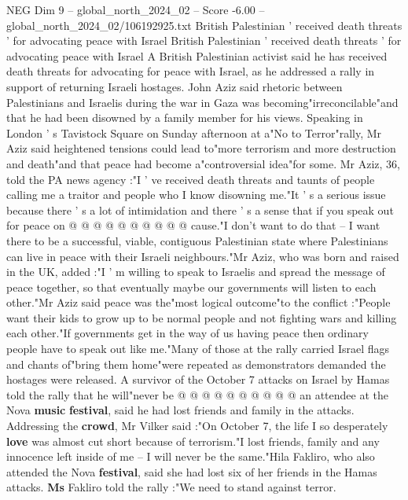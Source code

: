 \begin{textsample}{NEG Dim 9 – global\_north\_2024\_02 – Score -6.00 – global\_north\_2024\_02/106192925.txt}  \label{ex:f9_neg_285}
British Palestinian ' received death threats ' for advocating peace with Israel British Palestinian ' received death threats ' for advocating peace with Israel A British Palestinian activist said he has received death threats for advocating for peace with Israel, as he addressed a rally in support of returning Israeli hostages.
John Aziz said rhetoric between Palestinians and Israelis during the war in Gaza was becoming"irreconcilable"and that he had been disowned by a family member for his views.
Speaking in London ' s Tavistock Square on Sunday afternoon at a"No to Terror"rally, Mr Aziz said heightened tensions could lead to"more terrorism and more destruction and death"and that peace had become a"controversial idea"for some.
Mr Aziz, 36, told the PA news agency :"I ' ve received death threats and taunts of people calling me a traitor and people who I know disowning me."It ' s a serious issue because there ' s a lot of intimidation and there ' s a sense that if you speak out for peace on @ @ @ @ @ @ @ @ @ @ cause."I don't want to do that -- I want there to be a successful, viable, contiguous Palestinian state where Palestinians can live in peace with their Israeli neighbours."Mr Aziz, who was born and raised in the UK, added :"I ' m willing to speak to Israelis and spread the message of peace together, so that eventually maybe our governments will listen to each other."Mr Aziz said peace was the"most logical outcome"to the conflict :"People want their kids to grow up to be normal people and not fighting wars and killing each other."If governments get in the way of us having peace then ordinary people have to speak out like me."Many of those at the rally carried Israel flags and chants of"bring them home"were repeated as demonstrators demanded the hostages were released.
A survivor of the October 7 attacks on Israel by Hamas told the rally that he will"never be @ @ @ @ @ @ @ @ @ @ an attendee at the Nova \textbf{music} \textbf{festival}, said he had lost friends and family in the attacks.
Addressing the \textbf{crowd}, Mr Vilker said :"On October 7, the life I so desperately \textbf{love} was almost cut short because of terrorism."I lost friends, family and any innocence left inside of me -- I will never be the same."Hila Fakliro, who also attended the Nova \textbf{festival}, said she had lost six of her friends in the Hamas attacks. \textbf{Ms} Fakliro told the rally :"We need to stand against terror.

\end{textsample}
